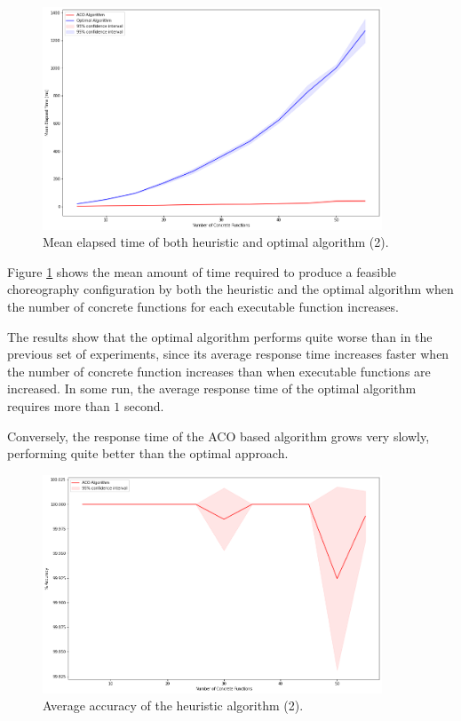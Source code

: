 \documentclass[12pt,a4paper]{report}
\begin{document}
\begin{figure}[h]
	\centering
	\includegraphics[width=0.9\textwidth]{./Images/ACOvsOptimalIncreasingConcrete.png}
	\caption{Mean elapsed time of both heuristic and optimal algorithm (2).}%
	\label{ACOvsOptimalIncreasingConcrete}
\end{figure}

Figure \ref{ACOvsOptimalIncreasingConcrete} shows the mean amount of time required to produce a feasible choreography configuration by both the heuristic and the optimal algorithm when the number of concrete functions for each executable function increases. 

The results show that the optimal algorithm performs quite worse than in the previous set of experiments, since its average response time increases faster when the number of concrete function increases than when executable functions are increased. In some run, the average response time of the optimal algorithm requires more than $1$ second. 

Conversely, the response time of the ACO based algorithm grows very slowly, performing quite better than the optimal approach.

\begin{figure}[h]
	\centering
	\includegraphics[width=0.9\textwidth]{./Images/ACOvsOptimalAccuracyIncreasingConcrete.png}
	\caption{Average accuracy of the heuristic algorithm (2).}%
	\label{ACOvsOptimalAccuracyIncreasingConcrete}
\end{figure}
\end{document}
